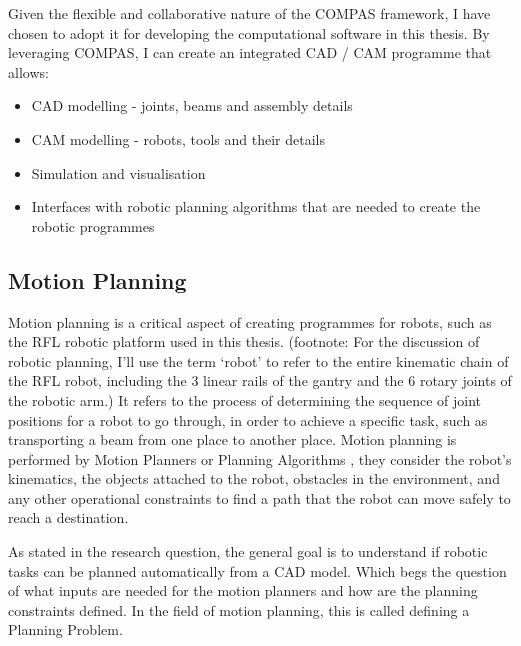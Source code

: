 Given the flexible and collaborative nature of the COMPAS framework, I have chosen to adopt it for developing the computational software in this thesis. By leveraging COMPAS, I can create an integrated CAD / CAM programme that allows:
\begin{itemize}
    \item CAD modelling - joints, beams and assembly details 
    \item CAM modelling - robots, tools and their details 
    \item Simulation and visualisation 
    \item Interfaces with robotic planning algorithms that are needed to create the robotic programmes 
\end{itemize}

\subsection{Motion Planning}
\label{subsection:exploration-2-motion-planning}

Motion planning is a critical aspect of creating programmes for robots, such as the RFL robotic platform used in this thesis. (footnote: For the discussion of robotic planning, I’ll use the term ‘robot’ to refer to the entire kinematic chain of the RFL robot, including the 3 linear rails of the gantry and the 6 rotary joints of the robotic arm.) It refers to the process of determining the sequence of joint positions for a robot to go through, in order to achieve a specific task, such as transporting a beam from one place to another place. Motion planning is performed by Motion Planners or Planning Algorithms \parencite{lavallePlanningAlgorithms2006}, they consider the robot's kinematics, the objects attached to the robot, obstacles in the environment, and any other operational constraints to find a path that the robot can move safely to reach a destination.

As stated in the research question, the general goal is to understand if robotic tasks can be planned automatically from a CAD model. Which begs the question of what inputs are needed for the motion planners and how are the planning constraints defined. In the field of motion planning, this is called defining a Planning Problem.

